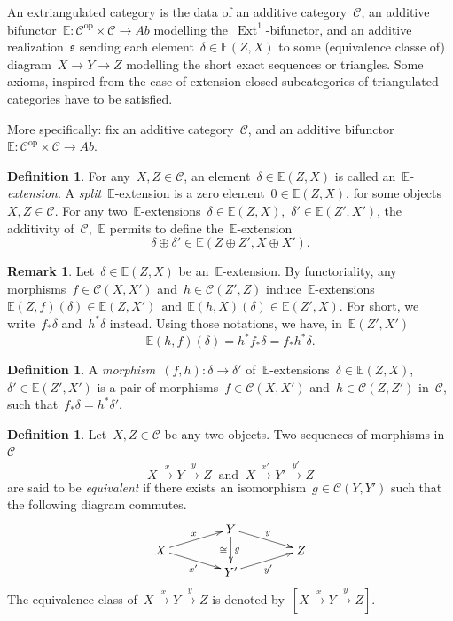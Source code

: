 \documentclass{amsart}
\theoremstyle{definition}
\newtheorem{definition}[theorem]{Definition}
\newtheorem{remark}[theorem]{Remark}
\newcommand{\darkblue}{\color{darkblue}} %
\newcommand{\defn}[1]{\textsl{\darkblue #1}} %
\newcommand{\cat}{\mathcal{C}}
\begin{document}
An extriangulated category is the data of an additive category~$\cat$, an additive bifunctor~$\mathbb{E}:\cat^\mathrm{op}\times\cat\to \mathit{Ab}$ modelling the~$\operatorname{Ext}^1$-bifunctor, and an additive realization~$\mathfrak{s}$ sending each element~$\delta\in\mathbb{E}(Z,X)$ to some (equivalence classe of) diagram~$X\to Y\to Z$ modelling the short exact sequences or triangles.
Some axioms, inspired from the case of extension-closed subcategories of triangulated categories have to be satisfied.

More specifically: fix an additive category~$\cat$, and an additive bifunctor~$\mathbb{E}: \cat^\mathrm{op}\times\cat\to\mathit{Ab}$.

\begin{definition}
For any~$X,Z\in\cat$, an element~$\delta\in\mathbb{E}(Z,X)$ is called an~\defn{$\mathbb{E}$-extension}.
A \defn{split}~$\mathbb{E}$-extension is a zero element~$0\in\mathbb{E}(Z,X)$, for some objects~$X,Z\in\cat$.
For any two~$\mathbb{E}$-extensions~$\delta\in\mathbb{E}(Z,X)$,~$\delta'\in\mathbb{E}(Z',X')$, the additivity of~$\cat$,~$\mathbb{E}$ permits to define the~$\mathbb{E}$-extension
\[
\delta\oplus\delta'\in\mathbb{E}(Z\oplus Z',X\oplus X').
\]
\end{definition}

\begin{remark}
Let~$\delta\in\mathbb{E}(Z,X)$ be an~$\mathbb{E}$-extension. By functoriality, any morphisms~$f\in\cat(X,X')$ and~$h\in\cat(Z',Z)$ induce~$\mathbb{E}$-extensions~$\mathbb{E}(Z,f)(\delta)\in\mathbb{E}(Z,X')\ \ \text{and}\ \ \mathbb{E}(h,X)(\delta)\in\mathbb{E}(Z',X)$.
For short, we write~$f_\ast\delta$ and~$h^\ast\delta$ instead.
Using those notations, we have, in~$\mathbb{E}(Z',X')$
\[ \mathbb{E}(h,f)(\delta)=h^\ast f_\ast\delta=f_\ast h^\ast\delta. \]
\end{remark}

\begin{definition}
A \defn{morphism}~$(f,h):\delta\to\delta'$ of~$\mathbb{E}$-extensions~$\delta\in\mathbb{E}(Z,X)$,~$\delta'\in\mathbb{E}(Z',X')$ is a pair of morphisms~$f\in\cat(X,X')$ and~$h\in\cat(Z,Z')$ in~$\cat$, such that~$f_\ast\delta=h^\ast\delta'.$
\end{definition}

\begin{definition}\label{DefSqEquiv}
Let~$X,Z\in\cat$ be any two objects. Two sequences of morphisms in~$\cat$
\[ X \overset{x}{\longrightarrow}Y\overset{y}{\longrightarrow}Z \ \text{ and } \ X\overset{x'}{\longrightarrow}Y'\overset{y'}{\longrightarrow}Z \]
are said to be \defn{equivalent} if there exists an isomorphism~$g\in\cat(Y,Y')$ such that the following diagram commutes.
\[
\xy
(-20,0)*+{X}="X";
(5,0)*+{}="1";
(0,6)*+{Y}="Y";
(0,-6)*+{Y'}="Y'";
(-5,0)*+{}="2";
(20,0)*+{Z}="Z";
%
{\ar^{x} "X";"Y"};
{\ar^{y} "Y";"Z"};
{\ar_{x^{\prime}} "X";"Y'"};
{\ar_{y^{\prime}} "Y'";"Z"};
%
{\ar^{g}_{\cong} "Y";"Y'"};
%
{\ar@{}|{} "X";"1"};
{\ar@{}|{} "2";"Z"};
\endxy
\]
The equivalence class of~$X \xrightarrow{x} Y \xrightarrow{y} Z$ is denoted by~$[X \xrightarrow{x} Y \xrightarrow{y} Z]$.
\end{definition}
\end{document}
